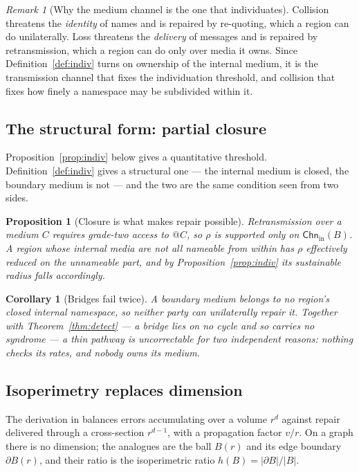 \documentclass[11pt]{article}
\theoremstyle{plain}
\newtheorem{proposition}[theorem]{Proposition}
\newtheorem{corollary}[theorem]{Corollary}
\theoremstyle{definition}
\theoremstyle{remark}
\newtheorem{remark}[theorem]{Remark}
\newcommand{\Chn}{\mathsf{Chn}}
\begin{document}
\begin{remark}[Why the medium channel is the one that individuates]
Collision threatens the \emph{identity} of names and is repaired by
re-quoting, which a region can do unilaterally. Loss threatens the
\emph{delivery} of messages and is repaired by retransmission, which a
region can do only over media it owns. Since Definition~\ref{def:indiv}
turns on ownership of the internal medium, it is the transmission channel
that fixes the individuation threshold, and collision that fixes how
finely a namespace may be subdivided within it.
\end{remark}

\subsection{The structural form: partial closure}

Proposition~\ref{prop:indiv} below gives a quantitative threshold.
Definition~\ref{def:indiv} gives a structural one --- the internal medium
is closed, the boundary medium is not --- and the two are the same
condition seen from two sides.

\begin{proposition}[Closure is what makes repair possible]
\label{prop:closurerepair}
Retransmission over a medium $C$ requires grade-two access to $@C$, so
$\rho$ is supported only on $\Chn_{\mathrm{in}}(B)$. A region whose
internal media are not all nameable from within has $\rho$ effectively
reduced on the unnameable part, and by
Proposition~\ref{prop:indiv} its sustainable radius falls accordingly.
\end{proposition}

\begin{corollary}[Bridges fail twice]
A boundary medium belongs to no region's closed internal namespace, so
neither party can unilaterally repair it. Together with
Theorem~\ref{thm:detect} --- a bridge lies on no cycle and so carries no
syndrome --- a thin pathway is uncorrectable for two independent reasons:
nothing checks its rates, and nobody owns its medium.
\end{corollary}

\subsection{Isoperimetry replaces dimension}

The derivation in \cite{compaut} balances errors accumulating over a volume
$r^d$ against repair delivered through a cross-section $r^{d-1}$, with a
propagation factor $v/r$. On a graph there is no dimension; the analogues
are the ball $B(r)$ and its edge boundary $\partial B(r)$, and their ratio
is the isoperimetric ratio $h(B) = |\partial B| / |B|$.
\end{document}
